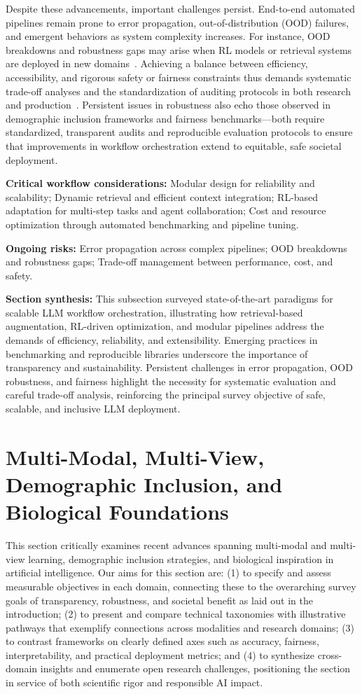 \documentclass[sigconf]{acmart}
\begin{document}
Despite these advancements, important challenges persist. End-to-end automated pipelines remain prone to error propagation, out-of-distribution (OOD) failures, and emergent behaviors as system complexity increases. For instance, OOD breakdowns and robustness gaps may arise when RL models or retrieval systems are deployed in new domains~\cite{ref9,ref43,ref80,ref104}. Achieving a balance between efficiency, accessibility, and rigorous safety or fairness constraints thus demands systematic trade-off analyses and the standardization of auditing protocols in both research and production~\cite{ref8,ref43,ref80,ref104}. Persistent issues in robustness also echo those observed in demographic inclusion frameworks and fairness benchmarks—both require standardized, transparent audits and reproducible evaluation protocols to ensure that improvements in workflow orchestration extend to equitable, safe societal deployment.

\textbf{Critical workflow considerations:}
Modular design for reliability and scalability;
Dynamic retrieval and efficient context integration;
RL-based adaptation for multi-step tasks and agent collaboration;
Cost and resource optimization through automated benchmarking and pipeline tuning.

\textbf{Ongoing risks:}
Error propagation across complex pipelines;
OOD breakdowns and robustness gaps;
Trade-off management between performance, cost, and safety.

\textbf{Section synthesis:}
This subsection surveyed state-of-the-art paradigms for scalable LLM workflow orchestration, illustrating how retrieval-based augmentation, RL-driven optimization, and modular pipelines address the demands of efficiency, reliability, and extensibility. Emerging practices in benchmarking and reproducible libraries underscore the importance of transparency and sustainability. Persistent challenges in error propagation, OOD robustness, and fairness highlight the necessity for systematic evaluation and careful trade-off analysis, reinforcing the principal survey objective of safe, scalable, and inclusive LLM deployment.

\section{Multi-Modal, Multi-View, Demographic Inclusion, and Biological Foundations}

This section critically examines recent advances spanning multi-modal and multi-view learning, demographic inclusion strategies, and biological inspiration in artificial intelligence. Our aims for this section are: (1) to specify and assess measurable objectives in each domain, connecting these to the overarching survey goals of transparency, robustness, and societal benefit as laid out in the introduction; (2) to present and compare technical taxonomies with illustrative pathways that exemplify connections across modalities and research domains; (3) to contrast frameworks on clearly defined axes such as accuracy, fairness, interpretability, and practical deployment metrics; and (4) to synthesize cross-domain insights and enumerate open research challenges, positioning the section in service of both scientific rigor and responsible AI impact.
\end{document}
